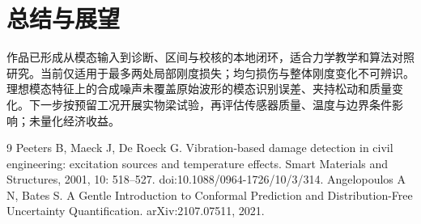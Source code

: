 \documentclass[UTF8,a4paper,10pt,fontset=fandol]{ctexart}
\begin{document}
\section{总结与展望}
作品已形成从模态输入到诊断、区间与校核的本地闭环，适合力学教学和算法对照研究。当前仅适用于最多两处局部刚度损失；均匀损伤与整体刚度变化不可辨识。理想模态特征上的合成噪声未覆盖原始波形的模态识别误差、夹持松动和质量变化。下一步按预留工况开展实物梁试验，再评估传感器质量、温度与边界条件影响；未量化经济收益。

\vspace{-5pt}
\begin{thebibliography}{9}\small\setlength{\itemsep}{0pt}
 Peeters B, Maeck J, De Roeck G. Vibration-based damage detection in civil engineering: excitation sources and temperature effects. Smart Materials and Structures, 2001, 10: 518--527. doi:10.1088/0964-1726/10/3/314.
 Angelopoulos A N, Bates S. A Gentle Introduction to Conformal Prediction and Distribution-Free Uncertainty Quantification. arXiv:2107.07511, 2021.
\end{thebibliography}
\end{document}
